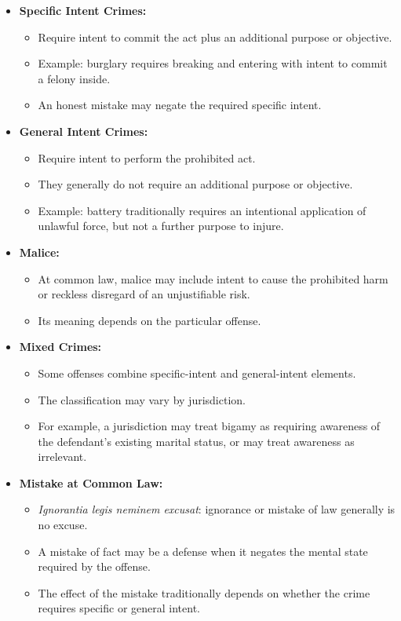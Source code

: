 \documentclass[11pt]{tex/lawoutline}
\begin{document}
\begin{itemize}
    \item \textbf{Specific Intent Crimes:}
    \begin{itemize}
        \item Require intent to commit the act plus an additional purpose or objective.
        \item Example: burglary requires breaking and entering with intent to commit a felony inside.
        \item An honest mistake may negate the required specific intent.
    \end{itemize}

    \item \textbf{General Intent Crimes:}
    \begin{itemize}
        \item Require intent to perform the prohibited act.
        \item They generally do not require an additional purpose or objective.
        \item Example: battery traditionally requires an intentional application of unlawful force, but not a further purpose to injure.
    \end{itemize}

    \item \textbf{Malice:}
    \begin{itemize}
        \item At common law, malice may include intent to cause the prohibited harm or reckless disregard of an unjustifiable risk.
        \item Its meaning depends on the particular offense.
    \end{itemize}

    \item \textbf{Mixed Crimes:}
    \begin{itemize}
        \item Some offenses combine specific-intent and general-intent elements.
        \item The classification may vary by jurisdiction.
        \item For example, a jurisdiction may treat bigamy as requiring awareness of the defendant's existing marital status, or may treat awareness as irrelevant.
    \end{itemize}

    \item \textbf{Mistake at Common Law:}
    \begin{itemize}
        \item \textit{Ignorantia legis neminem excusat}: ignorance or mistake of law generally is no excuse.
        \item A mistake of fact may be a defense when it negates the mental state required by the offense.
        \item The effect of the mistake traditionally depends on whether the crime requires specific or general intent.
    \end{itemize}
\end{itemize}
\end{document}
